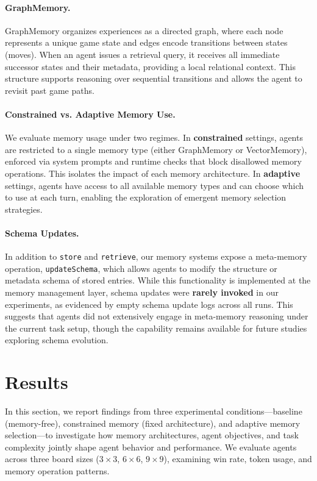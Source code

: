 \documentclass[10pt]{article}
\begin{document}
\paragraph{GraphMemory.}
GraphMemory organizes experiences as a directed graph, where each node represents a unique game state and edges encode transitions between states (moves). When an agent issues a retrieval query, it receives all immediate successor states and their metadata, providing a local relational context. This structure supports reasoning over sequential transitions and allows the agent to revisit past game paths.

\paragraph{Constrained vs. Adaptive Memory Use.}
We evaluate memory usage under two regimes. In \textbf{constrained} settings, agents are restricted to a single memory type (either GraphMemory or VectorMemory), enforced via system prompts and runtime checks that block disallowed memory operations. This isolates the impact of each memory architecture. In \textbf{adaptive} settings, agents have access to all available memory types and can choose which to use at each turn, enabling the exploration of emergent memory selection strategies.

\paragraph{Schema Updates.} 
In addition to \texttt{store} and \texttt{retrieve}, our memory systems expose a meta-memory operation, \texttt{updateSchema}, which allows agents to modify the structure or metadata schema of stored entries. While this functionality is implemented at the memory management layer, schema updates were \textbf{rarely invoked} in our experiments, as evidenced by empty schema update logs across all runs. This suggests that agents did not extensively engage in meta-memory reasoning under the current task setup, though the capability remains available for future studies exploring schema evolution.

\section{Results}

In this section, we report findings from three experimental conditions---baseline (memory-free), constrained memory (fixed architecture), and adaptive memory selection---to investigate how memory architectures, agent objectives, and task complexity jointly shape agent behavior and performance. We evaluate agents across three board sizes ($3\times3$, $6\times6$, $9\times9$), examining win rate, token usage, and memory operation patterns.
\end{document}

